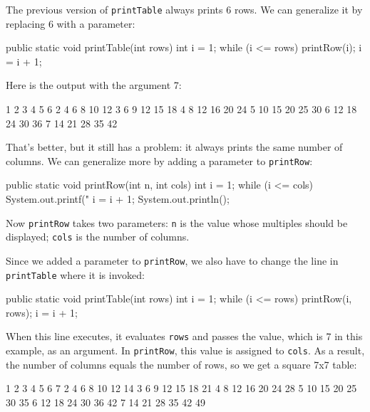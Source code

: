 \documentclass[12pt]{book}
\theoremstyle{exercise}
\newcommand{\java}[1]{\verb"#1"}
\newcommand{\java}[1]{\lstinline{#1}} %
\begin{document}
The previous version of \java{printTable} always prints 6 rows.
We can generalize it by replacing 6 with a parameter:

\begin{code}
    public static void printTable(int rows) {
        int i = 1;
        while (i <= rows) {
            printRow(i);
            i = i + 1;
        }
    }
\end{code}

Here is the output with the argument 7:

\begin{stdout}
   1   2   3   4   5   6
   2   4   6   8  10  12
   3   6   9  12  15  18
   4   8  12  16  20  24
   5  10  15  20  25  30
   6  12  18  24  30  36
   7  14  21  28  35  42
\end{stdout}

That's better, but it still has a problem: it always prints the same
number of columns.
We can generalize more by adding a parameter to \java{printRow}:

\begin{code}
    public static void printRow(int n, int cols) {
        int i = 1;
        while (i <= cols) {
            System.out.printf("%
            i = i + 1;
        }
        System.out.println();
    }
\end{code}

Now \java{printRow} takes two parameters: \java{n} is the value whose multiples should be displayed; \java{cols} is the number of columns.

Since we added a parameter to \java{printRow}, we also have to change the line in \java{printTable} where it is invoked:

\begin{code}
    public static void printTable(int rows) {
        int i = 1;
        while (i <= rows) {
            printRow(i, rows);
            i = i + 1;
        }
    }
\end{code}

When this line executes, it evaluates \java{rows} and passes the value, which is 7 in this example, as an argument.
In \java{printRow}, this value is assigned to \java{cols}.
As a result, the number of columns equals the number of rows, so we get a square 7x7 table:

\begin{stdout}
   1   2   3   4   5   6   7
   2   4   6   8  10  12  14
   3   6   9  12  15  18  21
   4   8  12  16  20  24  28
   5  10  15  20  25  30  35
   6  12  18  24  30  36  42
   7  14  21  28  35  42  49
\end{stdout}
\end{document}
